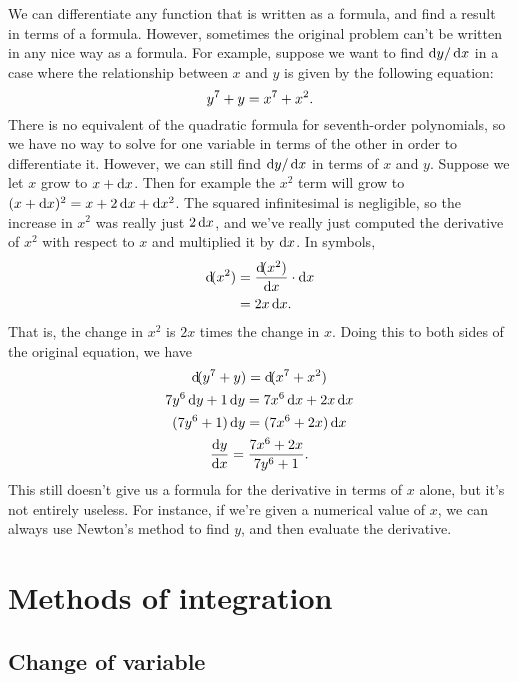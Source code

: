 We can differentiate any function that is written as a formula,
and find a result in terms of a formula. However, sometimes the
original problem can't be written in any nice way as a formula.
For example, suppose we want to find $\operatorname{d\!} y/\operatorname{d\!} x$ in a case
where the relationship between $x$
and $y$ is given by the following equation:
\begin{equation*}
  y^7+y = x^7+x^2.
\end{equation*}
There is no equivalent of the quadratic formula for seventh-order
polynomials, so we have no way to solve for one variable in terms
of the other in order to differentiate it. However, we can still
find $\operatorname{d\!} y/\operatorname{d\!} x$ in terms of $x$ and $y$. Suppose we let $x$
grow to $x+\operatorname{d\!} x$. Then for example the $x^2$ term will grow
to $(x+\operatorname{d\!} x)^2=x+2\operatorname{d\!} x+\operatorname{d\!} x^2$. The squared infinitesimal
is negligible, so the increase in $x^2$ was really just
$2\operatorname{d\!} x$, and we've really just computed the derivative of
$x^2$ with respect to $x$ and multiplied it by $\operatorname{d\!} x$. In
symbols,
\begin{align*}
  \operatorname{d\!}(x^2) &= \frac{\operatorname{d\!}(x^2)}{\operatorname{d\!} x} \cdot \operatorname{d\!} x \\
           &= 2x \operatorname{d\!} x.
\end{align*}
That is, the change in $x^2$ is $2x$ times the change in $x$.
Doing this to both sides of the original equation, we have
\begin{gather*}
  \der(y^7+y) = \der(x^7+x^2)\\
  7y^6\der y + 1\der y = 7x^6\der x + 2x\der x\\
  (7y^6+1)\der y = (7x^6+2x)\der x \\
  \frac{\der y}{\der x} = \frac{7x^6+2x}{7y^6+1}\eqquad.
\end{gather*}
This still doesn't give us a formula for the derivative in
terms of $x$ alone, but it's not entirely useless. For instance,
if we're given a numerical value of $x$, we can always use
Newton's method to find $y$, and then
evaluate the derivative.

\section{Methods of integration}

\subsection{Change of variable}\label{change-of-variable-for-integration}


